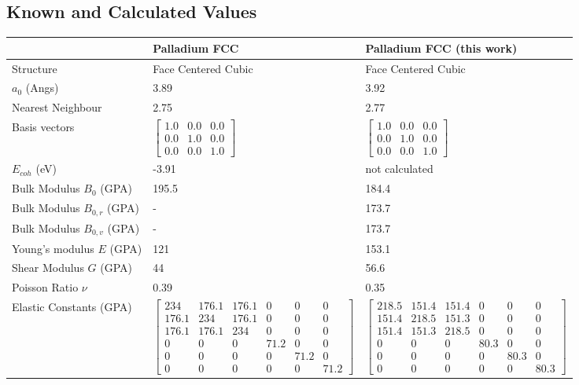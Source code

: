 



\subsection{Known and Calculated Values}


\renewcommand{\arraystretch}{1.7}
\begin{table}[ht]
\renewcommand{\arraystretch}{1.2}
\begin{tabular}{lll}
\hline\hline
& Palladium FCC & Palladium FCC (this work)  \\
\hline\hline
Structure                    & Face Centered Cubic & Face Centered Cubic  \\
$a_0$ (Angs)                 & 3.89  & 3.92  \\
Nearest Neighbour            & 2.75  & 2.77   \\
Basis vectors                & $\begin{bmatrix} 1.0 & 0.0 & 0.0 \\ 0.0 & 1.0 & 0.0 \\ 0.0 & 0.0 & 1.0 \end{bmatrix}$ & $\begin{bmatrix} 1.0 & 0.0 & 0.0 \\ 0.0 & 1.0 & 0.0 \\ 0.0 & 0.0 & 1.0 \end{bmatrix}$ \\
$E_{coh}$ (eV)               & -3.91 &  not calculated \\
Bulk Modulus $B_0$ (GPA)     & 195.5 & 184.4 \\
Bulk Modulus $B_{0,r}$ (GPA) & - & 173.7  \\
Bulk Modulus $B_{0,v}$ (GPA) & - & 173.7  \\
Young's modulus $E$ (GPA)    & 121 & 153.1  \\
Shear Modulus $G$ (GPA)      & 44 & 56.6  \\
Poisson Ratio $\nu$          & 0.39 &  0.35 \\
Elastic Constants (GPA)      & $\begin{bmatrix} 234 & 176.1 & 176.1 & 0 & 0 & 0 \\ 176.1 & 234 & 176.1 & 0 & 0 & 0 \\ 176.1 & 176.1 & 234 & 0 & 0 & 0 \\ 0 & 0 & 0 & 71.2 & 0 & 0 \\ 0 & 0 & 0 & 0 & 71.2 & 0 \\ 0 & 0 & 0 & 0 & 0 & 71.2 \end{bmatrix}$ & $\begin{bmatrix} 218.5 & 151.4 & 151.4 & 0 & 0 & 0 \\ 151.4 & 218.5 & 151.3 & 0 & 0 & 0 \\ 151.4 & 151.3 & 218.5 & 0 & 0 & 0 \\ 0 & 0 & 0 & 80.3 & 0 & 0 \\ 0 & 0 & 0 & 0 & 80.3 & 0 \\ 0 & 0 & 0 & 0 & 0 & 80.3 \end{bmatrix}$ \\

\end{tabular}
\end{table}

